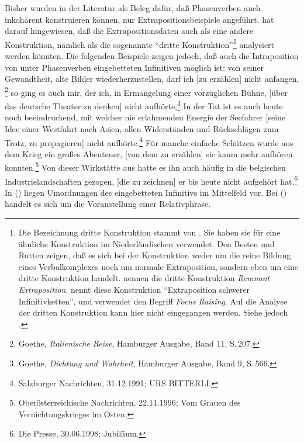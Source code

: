 \noindent
Bisher wurden in der Literatur als Beleg dafür, daß Phasenverben auch inkohärent konstruieren können,
nur Extrapositionsbeispiele angeführt. \citet{Reis2005a} hat darauf hingewiesen, daß
die Extrapositionsdaten auch als eine andere Konstruktion, nämlich als die sogenannte
"`dritte Konstruktion"'\footnote{
	Die Bezeichnung dritte Konstruktion stammt von \citet*{dBR89}.%
	Sie haben sie für eine ähnliche Konstruktion im 
	Niederländischen verwendet. 
	Den Besten und Rutten zeigen, daß es sich bei der Konstruktion weder 
	um die reine Bildung eines Verbalkomplexes noch um normale Extraposition,
	sondern eben um eine dritte Konstruktion handelt. \citet*{BBHR95}
        nennen die dritte Konstruktion \emph{Remnant Extraposition}.
%
        \citet*[]{Wunderlich80} nennt diese Konstruktion "`Extraposition schwerer Infinitivketten"', und
	\citet*[]{Uszkoreit87a} verwendet den Begriff \emph{Focus Raising}.
        Auf die Analyse der dritten Konstruktion kann hier nicht eingegangen werden.
        Siehe jedoch .%
} analysiert werden könnten. Die folgenden Beispiele zeigen jedoch,
daß auch die Intraposition von unter Phasenverben eingebetteten Infinitiven möglich ist:
\eal
\ex von seiner Gewandtheit, alte Bilder wiederherzustellen,  darf ich [zu erzählen] nicht anfangen,%
\footnote{
 Goethe, \emph{Italienische Reise}, Hamburger Ausgabe, Band 11, S.\,207.
}
\ex so ging es auch mir, der ich, in Ermangelung einer vorzüglichen Bühne, [über das deutsche Theater zu denken] nicht aufhörte,\footnote{
  Goethe, \emph{Dichtung und Wahrheit}, Hamburger Ausgabe, Band 9, S.\,566.
}
\ex\label{bsp-seefahrer} 
In der Tat ist es auch heute noch beeindruckend, 
    mit welcher nie erlahmenden Energie der Seefahrer 
    [seine Idee einer Westfahrt nach Asien, allen Widerständen und Rückschlägen zum Trotz, 
    zu propagieren] nicht aufhörte.\footnote{
      Salzburger Nachrichten, 31.12.1991; URS BITTERLI.%
    }
\zl
\eal
\ex Für manche einfache Schützen wurde aus dem Krieg ein großes Abenteuer, [von dem zu erzählen] 
    sie kaum mehr aufhören konnten.\footnote{
  Oberösterreichische Nachrichten, 22.11.1996; Vom Grauen des Vernichtungskrieges im Osten.%
}
\ex Von dieser Wirkstätte aus hatte es ihn auch häufig in die belgischen Industrielandschaften gezogen, [die zu zeichnen] er bis heute nicht aufgehört hat.\footnote{
  Die Presse, 30.06.1998; Jubiläum.%
}
\zl
In () liegen Umordnungen des eingebetteten Infinitivs im Mittelfeld vor. Bei () handelt
es sich um die Voranstellung einer Relativphrase.

